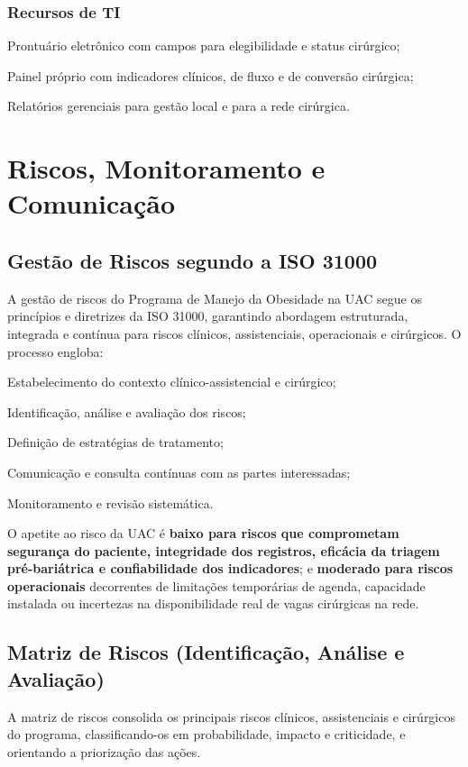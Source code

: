 \documentclass[12pt]{article}
\begin{document}
\subsubsection{Recursos de TI}
\label{sec:orgf33a9ae}
\begin{hlevelthree}
\item Prontuário eletrônico com campos para elegibilidade e status cirúrgico;
\item Painel próprio com indicadores clínicos, de fluxo e de conversão cirúrgica;
\item Relatórios gerenciais para gestão local e para a rede cirúrgica.
\end{hlevelthree}

\FGVNewPage
\section{Riscos, Monitoramento e Comunicação}
\label{sec:orgec9928a}
\subsection{Gestão de Riscos segundo a ISO 31000}
\label{sec:org124cd98}
A gestão de riscos do Programa de Manejo da Obesidade na UAC segue os princípios e diretrizes da ISO 31000, garantindo abordagem estruturada, integrada e contínua para riscos clínicos, assistenciais, operacionais e cirúrgicos. O processo engloba:
\begin{hleveltwo}
\item Estabelecimento do contexto clínico-assistencial e cirúrgico;
\item Identificação, análise e avaliação dos riscos;
\item Definição de estratégias de tratamento;
\item Comunicação e consulta contínuas com as partes interessadas;
\item Monitoramento e revisão sistemática.
\end{hleveltwo}

O apetite ao risco da UAC é \textbf{baixo para riscos que comprometam segurança do paciente, integridade dos registros, eficácia da triagem pré-bariátrica e confiabilidade dos indicadores}; e \textbf{moderado para riscos operacionais} decorrentes de limitações temporárias de agenda, capacidade instalada ou incertezas na disponibilidade real de vagas cirúrgicas na rede.

\subsection{Matriz de Riscos (Identificação, Análise e Avaliação)}
\label{sec:org88302c8}
A matriz de riscos consolida os principais riscos clínicos, assistenciais e cirúrgicos do programa, classificando-os em probabilidade, impacto e criticidade, e orientando a priorização das ações.
\end{document}
